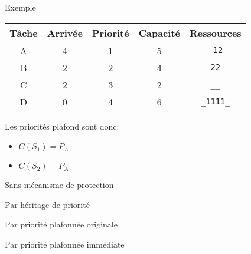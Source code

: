 \begin{frame}{Exemple}
  \begin{center}
    \begin{tabular}{ccccc}
      \hline
      Tâche & Arrivée & Priorité & Capacité & Ressources \\
      \hline
      A & 4 & 1 & 5 & \texttt{\_\_12\_}\\
      B & 2 & 2 & 4 & \texttt{\_22\_}\\
      C & 2 & 3 & 2 & \texttt{\_\_}\\
      D & 0 & 4 & 6 & \texttt{\_1111\_}\\
      \hline
    \end{tabular}
  \end{center}
  Les priorités plafond sont donc: 
  \begin{itemize}
  \item $C(S_1) = P_A$ 
  \item $C(S_2) = P_A$ 
  \end{itemize}
\end{frame} 

\begin{frame}{Sans mécanisme de protection}
  
\end{frame} 

\begin{frame}{Par héritage de priorité}
  
\end{frame} 

\begin{frame}{Par priorité plafonnée originale}
  
\end{frame} 

\begin{frame}{Par priorité plafonnée immédiate}
  
\end{frame} 

